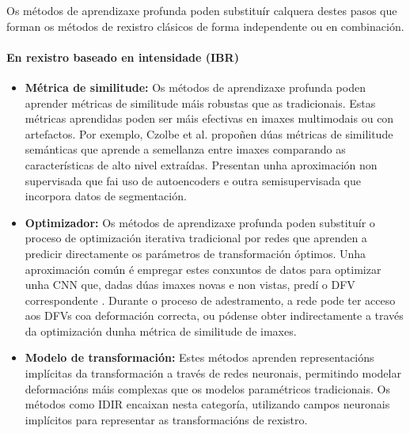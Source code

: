 Os métodos de aprendizaxe profunda poden substituír calquera destes pasos que forman os métodos de rexistro clásicos de forma independente ou en combinación.

\paragraph{En rexistro baseado en intensidade (IBR)}
\label{par:IBR_substitution}

\begin{itemize}
\item \textbf{Métrica de similitude:} Os métodos de aprendizaxe profunda poden aprender métricas de similitude máis robustas que as tradicionais. Estas métricas aprendidas poden ser máis efectivas en imaxes multimodais ou con artefactos.
Por exemplo, Czolbe et al. \cite{semanticsimilarity} propoñen dúas métricas de similitude semánticas que aprende a semellanza entre imaxes comparando as características de alto nivel extraídas. Presentan unha aproximación non supervisada que fai uso de autoencoders e outra semisupervisada que incorpora datos de segmentación.
\item \textbf{Optimizador:} Os métodos de aprendizaxe profunda poden substituír o proceso de optimización iterativa tradicional por redes que aprenden a predicir directamente os parámetros de transformación óptimos. Unha aproximación común é empregar estes conxuntos de datos para optimizar unha CNN que, dadas dúas imaxes novas e non vistas, predí o DFV correspondente \cite{defregcnn}. Durante o proceso de adestramento, a rede pode ter acceso aos DFVs coa deformación correcta, ou pódense obter indirectamente a través da optimización dunha métrica de similitude de imaxes.
\item \textbf{Modelo de transformación:} Estes métodos aprenden representacións implícitas da transformación a través de redes neuronais, permitindo modelar deformacións máis complexas que os modelos paramétricos tradicionais. Os métodos como IDIR \cite{wolterink2021implicit} encaixan nesta categoría, utilizando campos neuronais implícitos para representar as transformacións de rexistro.
\end{itemize}



